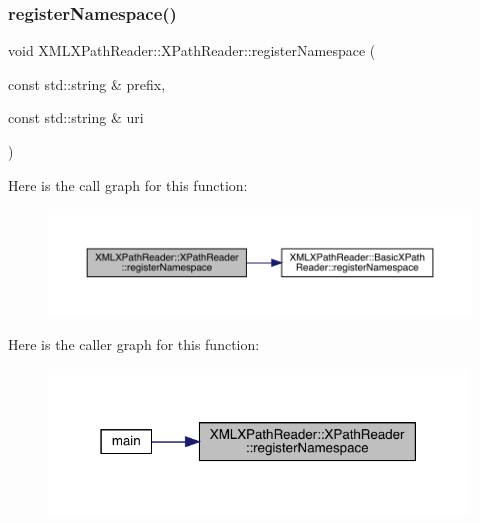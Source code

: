 \subsubsection{\texorpdfstring{registerNamespace()}{registerNamespace()}\hspace{0.1cm}{\footnotesize\ttfamily [1/2]}}
{\footnotesize\ttfamily void X\+M\+L\+X\+Path\+Reader\+::\+X\+Path\+Reader\+::register\+Namespace (\begin{DoxyParamCaption}\item[{const std\+::string \&}]{prefix,  }\item[{const std\+::string \&}]{uri }\end{DoxyParamCaption})\hspace{0.3cm}{\ttfamily [inline]}}

Here is the call graph for this function\+:
\nopagebreak
\begin{figure}[H]
\begin{center}
\leavevmode
\includegraphics[width=350pt]{d3/d5a/classXMLXPathReader_1_1XPathReader_a4df21ae718977be11eb5669002522ebb_cgraph}
\end{center}
\end{figure}
Here is the caller graph for this function\+:\nopagebreak
\begin{figure}[H]
\begin{center}
\leavevmode
\includegraphics[width=316pt]{d3/d5a/classXMLXPathReader_1_1XPathReader_a4df21ae718977be11eb5669002522ebb_icgraph}
\end{center}
\end{figure}
\mbox{\label{classXMLXPathReader_1_1XPathReader_a4df21ae718977be11eb5669002522ebb}} 

